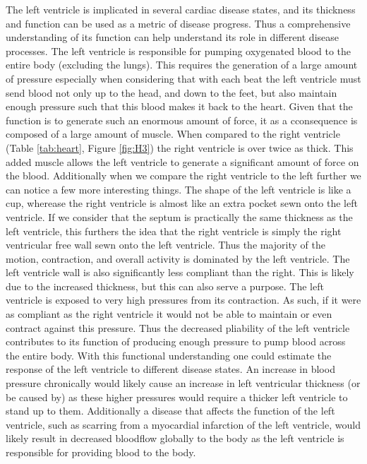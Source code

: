 \documentclass[12pt]{article}
\begin{document}
The left ventricle is implicated in several cardiac disease states, and its thickness and function can be used as a metric of disease progress.\cite{Parfrey1996}\cite{Aurigemma2006} Thus a comprehensive understanding of its function can help understand its role in different disease processes. The left ventricle is responsible for pumping oxygenated blood to the entire body (excluding the lungs). This requires the generation of a large amount of pressure especially when considering that with each beat the left ventricle must send blood not only up to the head, and down to the feet, but also maintain enough pressure such that this blood makes it back to the heart. Given that the function is to generate such an enormous amount of force, it as a cconsequence is composed of a large amount of muscle. When compared to the right ventricle (Table \ref{tab:heart}, Figure \ref{fig:H3}) the right ventricle is over twice as thick. This added muscle allows the left ventricle to generate a significant amount of force on the blood. Additionally when we compare the right ventricle to the left further we can notice a few more interesting things. The shape of the left ventricle is like a cup, wherease the right ventricle is almost like an extra pocket sewn onto the left ventricle. If we consider that the septum is practically the same thickness as the left ventricle, this furthers the idea that the right ventricle is simply the right ventricular free wall sewn onto the left ventricle. Thus the majority of the motion, contraction, and overall activity is dominated by the left ventricle. The left ventricle wall is also significantly less compliant than the right. This is likely due to the increased thickness, but this can also serve a purpose. The left ventricle is exposed to very high pressures from its contraction. As such, if it were as compliant as the right ventricle it would not be able to maintain or even contract against this pressure. Thus the decreased pliability of the left ventricle contributes to its function of producing enough pressure to pump blood across the entire body. With this functional understanding one could estimate the response of the left ventricle to different disease states. An increase in blood pressure chronically would likely cause an increase in left ventricular thickness (or be caused by) as these higher pressures would require a thicker left ventricle to stand up to them. Additionally a disease that affects the function of the left ventricle, such as scarring from a myocardial infarction of the left ventricle, would likely result in decreased bloodflow globally to the body as the left ventricle is responsible for providing blood to the body.
\end{document}
